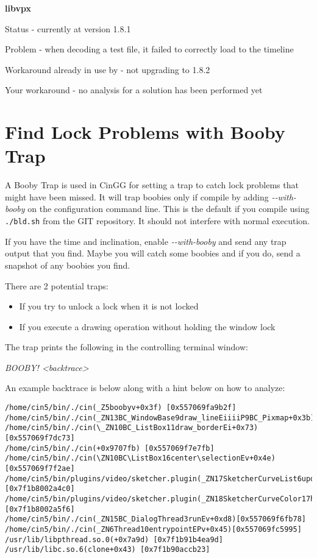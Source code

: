 \textbf{libvpx}
\begin{description}[noitemsep]
     \item Status - currently at version 1.8.1
     \item Problem - when decoding a test file, it failed to correctly load to the timeline
     \item Workaround already in use by \CGG{} - not upgrading to 1.8.2
     \item Your workaround - no analysis for a solution has been performed yet
\end{description}

\section{Find Lock Problems with Booby Trap}
\label{sec:find_lock_problems_booby_trap}

A Booby Trap is used in CinGG for setting a trap to catch lock problems that might have been missed. It will trap boobies only if compile by adding \textit{-{}-with-booby} on the configuration command line. This is the default if you compile using \texttt{./bld.sh} from the GIT repository. It should not interfere with normal execution.

If you have the time and inclination, enable \textit{-{}-with-booby} and send any trap output that you find. Maybe you will catch some boobies and if you do, send a snapshot of any boobies you find.

There are 2 potential traps:

\begin{itemize}[nosep]
	\item If you try to unlock a lock when it is not locked
	\item If you execute a drawing operation without holding the window lock
\end{itemize}

The trap prints the following in the controlling terminal window:

\hspace{2em} \textit{BOOBY! \qquad <backtrace>}

An example backtrace is below along with a hint below on how to analyze:

\begin{lstlisting}[numbers=none]
/home/cin5/bin/./cin(_Z5boobyv+0x3f) [0x557069fa9b2f] /home/cin5/bin/./cin(_ZN13BC_WindowBase9draw_lineEiiiiP9BC_Pixmap+0x3b)0x557069fb9a9b]
/home/cin5/bin/./cin(\_ZN10BC_ListBox11draw_borderEi+0x73)[0x557069f7dc73]
/home/cin5/bin/./cin(+0x9707fb) [0x557069f7e7fb]
/home/cin5/bin/./cin(\ZN10BC\ListBox16center\selectionEv+0x4e)[0x557069f7f2ae]
/home/cin5/bin/plugins/video/sketcher.plugin(_ZN17SketcherCurveList6updateEi+0x1a0)[0x7f1b8002a4c0]
/home/cin5/bin/plugins/video/sketcher.plugin(_ZN18SketcherCurveColor17handle_done_eventEi+0x76)[0x7f1b8002a5f6]
/home/cin5/bin/./cin(_ZN15BC_DialogThread3runEv+0xd8)[0x557069f6fb78]
/home/cin5/bin/./cin(_ZN6Thread10entrypointEPv+0x45)[0x557069fc5995]
/usr/lib/libpthread.so.0(+0x7a9d) [0x7f1b91b4ea9d]
/usr/lib/libc.so.6(clone+0x43) [0x7f1b90accb23]
\end{lstlisting}

